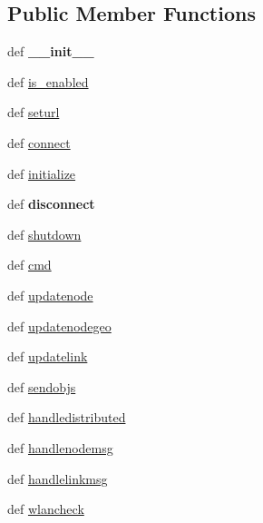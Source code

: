 \subsection*{Public Member Functions}
\begin{DoxyCompactItemize}
\item 
\hypertarget{classcore_1_1sdt_1_1_sdt_a3b81e6557de83fdd74f4cd25951f1566}{def {\bfseries \+\_\+\+\_\+init\+\_\+\+\_\+}}\label{classcore_1_1sdt_1_1_sdt_a3b81e6557de83fdd74f4cd25951f1566}

\item 
def \hyperlink{classcore_1_1sdt_1_1_sdt_afc44e07bedf6f05e56d600d9b4fee6af}{is\+\_\+enabled}
\item 
def \hyperlink{classcore_1_1sdt_1_1_sdt_ad0ed5e42af2a0184aff3b87def5ba9c4}{seturl}
\item 
def \hyperlink{classcore_1_1sdt_1_1_sdt_abed8c7d694fe3d39bd942d7441ddad89}{connect}
\item 
def \hyperlink{classcore_1_1sdt_1_1_sdt_a8a97ea248dc9d10712f2cf864be66ecc}{initialize}
\item 
\hypertarget{classcore_1_1sdt_1_1_sdt_ab70502b52940817654194fc344c55893}{def {\bfseries disconnect}}\label{classcore_1_1sdt_1_1_sdt_ab70502b52940817654194fc344c55893}

\item 
def \hyperlink{classcore_1_1sdt_1_1_sdt_ab9d646f0cdde7e39aee668f8ee57d655}{shutdown}
\item 
def \hyperlink{classcore_1_1sdt_1_1_sdt_aad035cee0656bfc795f4e380f71d69ec}{cmd}
\item 
def \hyperlink{classcore_1_1sdt_1_1_sdt_a039f31575cd823da550fb9052ca84960}{updatenode}
\item 
def \hyperlink{classcore_1_1sdt_1_1_sdt_a87282e971d0ee2e95f312feac377a2b5}{updatenodegeo}
\item 
def \hyperlink{classcore_1_1sdt_1_1_sdt_a927d2f527856477e078e04894ddfe7ea}{updatelink}
\item 
def \hyperlink{classcore_1_1sdt_1_1_sdt_ad6474617fed6f4e8e53aef589dcef526}{sendobjs}
\item 
def \hyperlink{classcore_1_1sdt_1_1_sdt_aae197af4a84c02540e5d44e5645a0a67}{handledistributed}
\item 
def \hyperlink{classcore_1_1sdt_1_1_sdt_a024f2ead9e6282fe64627b0171a70660}{handlenodemsg}
\item 
def \hyperlink{classcore_1_1sdt_1_1_sdt_af6c3cd301648532b6a1caca6d7069110}{handlelinkmsg}
\item 
def \hyperlink{classcore_1_1sdt_1_1_sdt_afcc8c6ff58974c92ec8f62f90d10a8a7}{wlancheck}
\end{DoxyCompactItemize}
